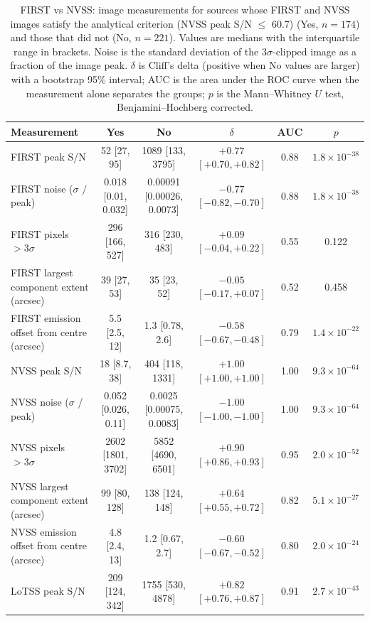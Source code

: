 \begin{table}
\centering
\caption{FIRST vs NVSS: image measurements for sources whose FIRST and NVSS images satisfy the analytical criterion (NVSS peak S/N $\leq$ 60.7) (Yes, $n=174$) and those that did not (No, $n=221$). Values are medians with the interquartile range in brackets. Noise is the standard deviation of the $3\sigma$-clipped image as a fraction of the image peak. $\delta$ is Cliff's delta (positive when No values are larger) with a bootstrap 95\% interval; AUC is the area under the ROC curve when the measurement alone separates the groups; $p$ is the Mann--Whitney $U$ test, Benjamini--Hochberg corrected.}
\label{tab:morphology_analytical_FIRST_vs_NVSS}
\begin{tabular}{lccccc}
\hline
Measurement & Yes & No & $\delta$ & AUC & $p$ \\
\hline
FIRST peak S/N & 52 [27, 95] & 1089 [133, 3795] & $+0.77$ $[+0.70, +0.82]$ & 0.88 & $1.8\times10^{-38}$ \\
FIRST noise ($\sigma$ / peak) & 0.018 [0.01, 0.032] & 0.00091 [0.00026, 0.0073] & $-0.77$ $[-0.82, -0.70]$ & 0.88 & $1.8\times10^{-38}$ \\
FIRST pixels $>3\sigma$ & 296 [166, 527] & 316 [230, 483] & $+0.09$ $[-0.04, +0.22]$ & 0.55 & 0.122 \\
FIRST largest component extent (arcsec) & 39 [27, 53] & 35 [23, 52] & $-0.05$ $[-0.17, +0.07]$ & 0.52 & 0.458 \\
FIRST emission offset from centre (arcsec) & 5.5 [2.5, 12] & 1.3 [0.78, 2.6] & $-0.58$ $[-0.67, -0.48]$ & 0.79 & $1.4\times10^{-22}$ \\
NVSS peak S/N & 18 [8.7, 38] & 404 [118, 1331] & $+1.00$ $[+1.00, +1.00]$ & 1.00 & $9.3\times10^{-64}$ \\
NVSS noise ($\sigma$ / peak) & 0.052 [0.026, 0.11] & 0.0025 [0.00075, 0.0083] & $-1.00$ $[-1.00, -1.00]$ & 1.00 & $9.3\times10^{-64}$ \\
NVSS pixels $>3\sigma$ & 2602 [1801, 3702] & 5852 [4690, 6501] & $+0.90$ $[+0.86, +0.93]$ & 0.95 & $2.0\times10^{-52}$ \\
NVSS largest component extent (arcsec) & 99 [80, 128] & 138 [124, 148] & $+0.64$ $[+0.55, +0.72]$ & 0.82 & $5.1\times10^{-27}$ \\
NVSS emission offset from centre (arcsec) & 4.8 [2.4, 13] & 1.2 [0.67, 2.7] & $-0.60$ $[-0.67, -0.52]$ & 0.80 & $2.0\times10^{-24}$ \\
LoTSS peak S/N & 209 [124, 342] & 1755 [530, 4878] & $+0.82$ $[+0.76, +0.87]$ & 0.91 & $2.7\times10^{-43}$ \\

\end{tabular}
\end{table}
